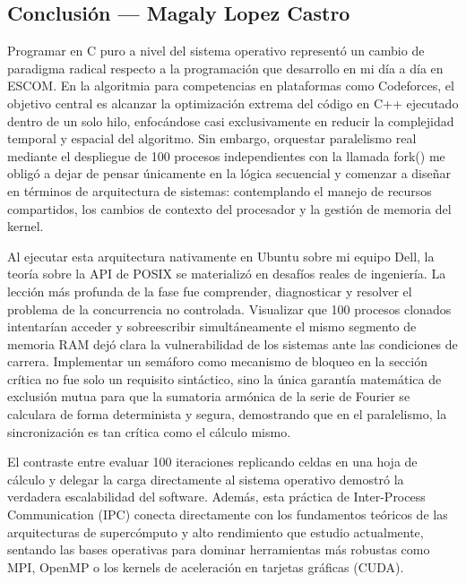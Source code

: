 \subsection{Conclusión — Magaly Lopez Castro}
\label{sec:cap03:concl:maga}

Programar en C puro a nivel del sistema operativo representó un cambio de paradigma radical respecto a la programación que desarrollo en mi día a día en ESCOM. En la algoritmia para competencias en plataformas como Codeforces, el objetivo central es alcanzar la optimización extrema del código en C++ ejecutado dentro de un solo hilo, enfocándose casi exclusivamente en reducir la complejidad temporal y espacial del algoritmo. Sin embargo, orquestar paralelismo real mediante el despliegue de 100 procesos independientes con la llamada fork() me obligó a dejar de pensar únicamente en la lógica secuencial y comenzar a diseñar en términos de arquitectura de sistemas: contemplando el manejo de recursos compartidos, los cambios de contexto del procesador y la gestión de memoria del kernel.

Al ejecutar esta arquitectura nativamente en Ubuntu sobre mi equipo Dell, la teoría sobre la API de POSIX se materializó en desafíos reales de ingeniería. La lección más profunda de la fase fue comprender, diagnosticar y resolver el problema de la concurrencia no controlada. Visualizar que 100 procesos clonados intentarían acceder y sobreescribir simultáneamente el mismo segmento de memoria RAM dejó clara la vulnerabilidad de los sistemas ante las condiciones de carrera. Implementar un semáforo como mecanismo de bloqueo en la sección crítica no fue solo un requisito sintáctico, sino la única garantía matemática de exclusión mutua para que la sumatoria armónica de la serie de Fourier se calculara de forma determinista y segura, demostrando que en el paralelismo, la sincronización es tan crítica como el cálculo mismo.

El contraste entre evaluar 100 iteraciones replicando celdas en una hoja de cálculo y delegar la carga directamente al sistema operativo demostró la verdadera escalabilidad del software. Además, esta práctica de Inter-Process Communication (IPC) conecta directamente con los fundamentos teóricos de las arquitecturas de supercómputo y alto rendimiento que estudio actualmente, sentando las bases operativas para dominar herramientas más robustas como MPI, OpenMP o los kernels de aceleración en tarjetas gráficas (CUDA).

